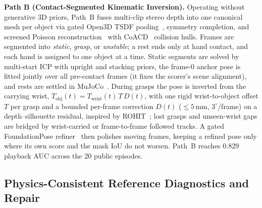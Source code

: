 \documentclass[10pt]{nvidiaextabstract}
\begin{document}
\textbf{Path B (Contact-Segmented Kinematic Inversion).} Operating without generative 3D priors, Path~B fuses multi-clip stereo depth into one canonical mesh per object via gated Open3D TSDF pooling~\cite{curless1996volumetric,zhou2018open3d}, symmetry completion, and screened Poisson reconstruction~\cite{kazhdan2013screened} with CoACD~\cite{wei2022coacd} collision hulls. Frames are segmented into \emph{static}, \emph{grasp}, or \emph{unstable}; a rest ends only at hand contact, and each hand is assigned to one object at a time. Static segments are solved by multi-start ICP with upright and stacking priors, the frame-0 anchor pose is fitted jointly over all pre-contact frames (it fixes the scorer's scene alignment), and rests are settled in MuJoCo~\cite{todorov2012mujoco}. During grasps the pose is inverted from the carrying wrist, $T_{\text{obj}}(t) = T_{\text{wrist}}(t)\,T\,D(t)$, with one rigid wrist-to-object offset $T$ per grasp and a bounded per-frame correction $D(t)$ ($\le 5$\,mm, $3^\circ$/frame) on a depth--silhouette residual, inspired by ROHIT~\cite{rohit}; lost grasps and unseen-wrist gaps are bridged by wrist-carried or frame-to-frame followed tracks. A gated FoundationPose refiner~\cite{wen2024foundationpose} then polishes moving frames, keeping a refined pose only where its own score and the mask IoU do not worsen. Path~B reaches 0.829 playback AUC across the 20 public episodes.

\subsection{Physics-Consistent Reference Diagnostics and Repair}
\label{sec:repair}
\end{document}
